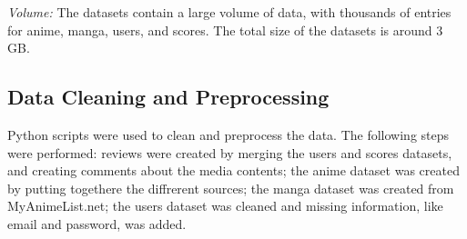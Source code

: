 \textit{Volume:} The datasets contain a large volume of data, with thousands of entries for anime, manga, users, and scores. The total size of the datasets is around 3 GB.

\subsection{Data Cleaning and Preprocessing}
Python scripts were used to clean and preprocess the data. The following steps were performed:
reviews were created by merging the users and scores datasets, and creating comments about the media contents;
the anime dataset was created by putting togethere the diffrerent sources;
the manga dataset was created from MyAnimeList.net;
the users dataset was cleaned and missing information, like email and password, was added.


